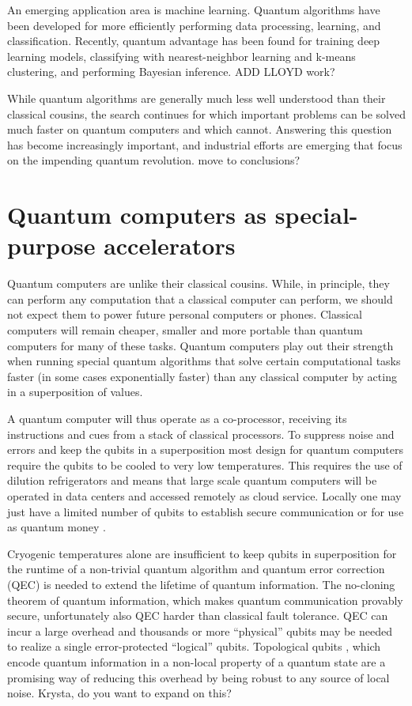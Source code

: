 \documentclass[journal]{IEEEtran}
\begin{document}
An emerging application area is machine learning.  Quantum algorithms have been developed for more efficiently performing data processing, learning, and classification.  Recently, quantum advantage has been found for training deep learning models, classifying with nearest-neighbor learning and k-means clustering, and performing Bayesian inference.
{\color{red} ADD LLOYD work?}

While quantum algorithms are generally much less well understood than their classical cousins, the search continues for which important problems can be solved much faster on quantum computers and which cannot. Answering this question has become increasingly important, and industrial efforts are emerging that focus on the impending quantum revolution. {\color{red} move to conclusions?}

\section{Quantum computers as special-purpose accelerators }


Quantum computers are unlike their classical cousins.  While, in principle,  they can perform any computation that a classical computer can perform, we should not expect them to power future personal computers or phones. Classical computers will remain cheaper, smaller and more portable than quantum computers for many of these tasks. Quantum computers play out their strength when running special quantum algorithms that solve certain computational tasks faster (in some cases exponentially faster) than any classical computer by acting in a superposition of values.  

A quantum computer will thus operate as a co-processor, receiving its instructions and cues from a stack of classical processors. To suppress noise and errors and keep the qubits in a superposition most design for quantum computers require the qubits to be cooled to very low temperatures. This requires the use of dilution refrigerators and means that large scale quantum computers will be operated in data centers and accessed remotely as cloud service. Locally one may just have a limited number of qubits to establish secure communication or for use as quantum money .

Cryogenic temperatures alone are insufficient to keep qubits in superposition for the runtime of a non-trivial quantum algorithm and quantum error correction (QEC) \cite{qec} is needed to extend the lifetime of quantum information. The no-cloning theorem of quantum information, which makes quantum communication provably secure, unfortunately also QEC harder than classical fault tolerance. QEC can incur a large overhead and thousands or more ``physical'' qubits may be needed to realize a single error-protected ``logical'' qubits. Topological qubits \cite{tqc}, which  encode  quantum information in a non-local property of a quantum state are a promising way of reducing this overhead by being robust to any source of local noise. {\color{red} Krysta, do you want to expand on this?}
\end{document}
